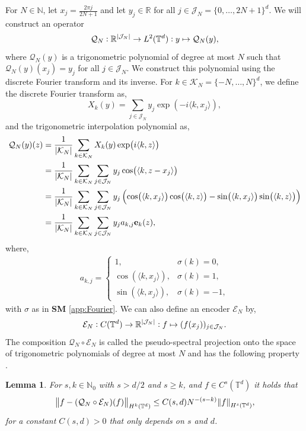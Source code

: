 \documentclass{article}
\numberwithin{equation}{section}
\newcommand{\fb}{\bm{\mathrm{e}}}
\newcommand{\T}{\mathbb{T}}
\newcommand{\R}{\mathbb{R}}
\newcommand{\N}{\mathbb{N}}
\newcommand{\cE}{\mathcal{E}}
\newcommand{\cJ}{\mathcal{J}}
\newcommand{\cK}{\mathcal{K}}
\newcommand{\cQ}{\mathcal{Q}}
\newcommand{\1}{\mathbbm{1}}
\newtheorem{lemma}[theorem]{Lemma}
\begin{document}
For $N\in\N$, let $x_j = \frac{2\pi j}{2N+1}$ and let $y_j\in\R$ for all $j\in \cJ_N = \{0, \ldots, 2N+1\}^d$. We will construct an operator 
\begin{equation}
    \cQ_N: \R^{\abs{\cJ_N}} \to L^2(\T^d): y \mapsto \cQ_N(y), 
\end{equation}
where $\cQ_N(y)$ is a trigonometric polynomial of degree at most $N$ such that $\cQ_N(y)(x_j) = y_j$ for all $j\in \cJ_N$. We construct this polynomial using the discrete Fourier transform and its inverse. 
For $k\in \cK_N = \{-N, \ldots, N\}^d$, we define the discrete Fourier transform as,
\begin{equation}
    X_k(y) = \sum_{j\in \cJ_N} y_j \exp(-i \langle k, x_j\rangle), 
\end{equation}
and the trigonometric interpolation polynomial as, 
\begin{equation}\label{eq:trig-pol}
\begin{split}
    \cQ_N(y)(z) &= \frac{1}{\abs{\cK_N}}\sum_{k\in \cK_N} X_k(y) \exp(i \langle k, z\rangle) \\
    & = \frac{1}{\abs{\cK_N}} \sum_{k\in \cK_N} \sum_{j\in \cJ_N} y_j \cos( \langle k, z-x_j\rangle)\\
    &= \frac{1}{\abs{\cK_N}} \sum_{k\in \cK_N} \sum_{j\in \cJ_N} y_j \left(\cos( \langle k, x_j\rangle)\cos( \langle k, z\rangle)-\sin( \langle k, x_j\rangle)\sin( \langle k, z\rangle)\right)\\
     &= \frac{1}{\abs{\cK_N}} \sum_{k\in \cK_N} \sum_{j\in \cJ_N} y_j a_{k,j} \fb_k(z), 
\end{split}
\end{equation}
where,
\begin{align}\label{eq:trig-pol-coeff}
a_{k,j}
=
\begin{cases}
1,
& \sigma(k)=0, \\
\cos( \langle k, x_j\rangle),
& \sigma(k)=1, \\
\sin( \langle k, x_j\rangle),
& \sigma(k)=-1,
\end{cases}
\end{align}
with $\sigma$ as in \textbf{SM} \ref{app:Fourier}.
We can also define an encoder $\cE_N$ by, 
\begin{equation}\label{eq:encoder}
    \cE_N: C(\T^d)\to \R^{\abs{\cJ_N}}: f\mapsto (f(x_j))_{j\in\cJ_N}.
\end{equation}
The composition $\cQ_N\circ \cE_N$ is called the pseudo-spectral projection onto the space of trigonometric polynomials of degree at most $N$ and has the following property \cite{kovachki2021universal}. 
\begin{lemma}\label{lem:acc-trig-pol}
For $s, k\in\N_0$ with $s>d/2$ and $s\geq k$, and $f\in C^s(\T^d)$ it holds that 
\begin{equation}%
    \norm{f-(\cQ_N\circ\cE_N)(f)}_{H^k(\T^d)}\leq C(s,d)N^{-(s-k)}\norm{f}_{H^s(\T^d)}, 
\end{equation}
for a constant $C(s,d)>0$ that only depends on $s$ and $d$. 
\end{lemma}
\end{document}
